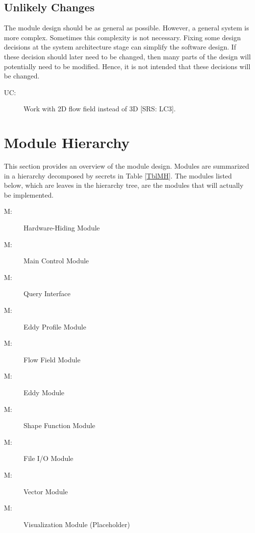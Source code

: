 \documentclass[12pt, titlepage]{article}
\newcounter{ucnum}
\newcommand{\uctheucnum}{UC\theucnum}
\newcounter{mnum}
\newcommand{\mthemnum}{M\themnum}
\begin{document}
\subsection{Unlikely Changes} \label{SecUchange}

The module design should be as general as possible. However, a general system is
more complex. Sometimes this complexity is not necessary. Fixing some design
decisions at the system architecture stage can simplify the software design. If
these decision should later need to be changed, then many parts of the design
will potentially need to be modified. Hence, it is not intended that these
decisions will be changed.

\begin{description}
\item[ \uctheucnum \label{uc2D}:] Work with 2D flow field instead of 3D [SRS: LC3].
\end{description}

\section{Module Hierarchy} \label{SecMH}

This section provides an overview of the module design. Modules are summarized
in a hierarchy decomposed by secrets in Table \ref{TblMH}. The modules listed
below, which are leaves in the hierarchy tree, are the modules that will
actually be implemented.

\begin{description}
\item [ \mthemnum \label{mHH}:] Hardware-Hiding Module
\item [ \mthemnum \label{mMain}:] Main Control Module
\item [ \mthemnum \label{mQuery}:] Query Interface
\item [ \mthemnum \label{mProf}:] Eddy Profile Module
\item [ \mthemnum \label{mFlow}:] Flow Field Module
\item [ \mthemnum \label{mEddy}:] Eddy Module
\item [ \mthemnum \label{mShape}:] Shape Function Module
\item [ \mthemnum \label{mFile}:] File I/O Module
\item [ \mthemnum \label{mVector}:] Vector Module
\item [ \mthemnum \label{mVisual}:] Visualization Module (Placeholder)
\end{description}
\end{document}
